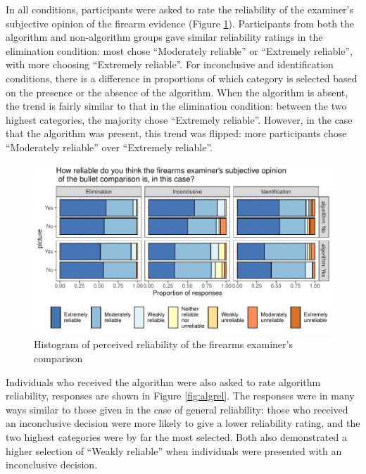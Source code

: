 \documentclass[print]{nuthesis}
\begin{document}
In all conditions, participants were asked to rate the reliability of the examiner's subjective opinion of the firearm evidence (Figure \ref{fig:examrel}).
Participants from both the algorithm and non-algorithm groups gave similar reliability ratings in the elimination condition: most chose ``Moderately reliable'' or ``Extremely reliable'', with more choosing ``Extremely reliable''.
For inconclusive and identification conditions, there is a difference in proportions of which category is selected based on the presence or the absence of the algorithm.
When the algorithm is absent, the trend is fairly similar to that in the elimination condition: between the two highest categories, the majority chose ``Extremely reliable''.
However, in the case that the algorithm was present, this trend was flipped: more participants chose ``Moderately reliable'' over ``Extremely reliable''.

\begin{figure}

{\centering \includegraphics[width=\linewidth]{thesis_files/figure-latex/examrel-1} 

}

\caption{Histogram of perceived reliability of the firearms examiner's comparison}\label{fig:examrel}
\end{figure}

Individuals who received the algorithm were also asked to rate algorithm reliability, responses are shown in Figure \ref{fig:algrel}.
The responses were in many ways similar to those given in the case of general reliability: those who received an inconclusive decision were more likely to give a lower reliability rating, and the two highest categories were by far the most selected.
Both also demonstrated a higher selection of ``Weakly reliable'' when individuals were presented with an inconclusive decision.
\end{document}
